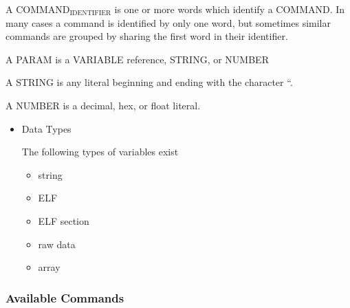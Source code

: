 \documentclass[11pt]{article}
\begin{document}
    A COMMAND$_{\mathrm{IDENTIFIER}}$ is one or more words which identify a
    COMMAND. In many cases a command is identified by only one word,
    but sometimes similar commands are grouped by sharing the first
    word in their identifier.

    A PARAM is a VARIABLE reference, STRING, or NUMBER

    A STRING is any literal beginning and ending with the character ``.

    A NUMBER is a decimal, hex, or float literal.

\begin{itemize}

\item Data Types\\
\label{sec-2.1.1.1}

     The following types of variables exist
\begin{itemize}
\item string
\item ELF
\item ELF section
\item raw data
\item array
\end{itemize}
\end{itemize} %
\subsubsection{Available Commands}
\label{sec-2.1.2}
\end{document}
